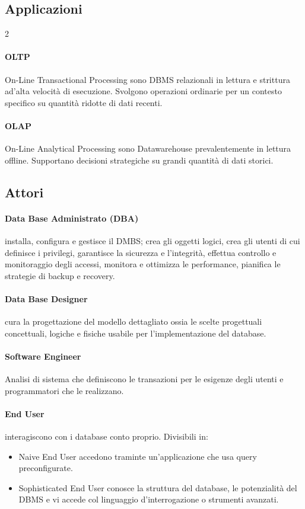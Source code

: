\subsection{Applicazioni}
\begin{paracol}{2}
	\paragraph{OLTP} On-Line Transactional Processing sono DBMS relazionali in lettura e strittura ad'alta velocità di esecuzione. Svolgono operazioni ordinarie per un contesto specifico su quantità ridotte di dati recenti.
	\switchcolumn
	\paragraph{OLAP} On-Line Analytical Processing sono Datawarehouse prevalentemente in lettura offline. Supportano decisioni strategiche su grandi quantità di dati storici.
\end{paracol}
\subsection{Attori}
\paragraph{Data Base Administrato (DBA)} installa, configura e gestisce il DMBS; crea gli oggetti logici, crea gli utenti di cui definisce i privilegi, garantisce la sicurezza e l'integrità, effettua controllo e monitoraggio degli accessi, monitora e ottimizza le performance, pianifica le strategie di backup e recovery.
\paragraph{Data Base Designer} cura la progettazione del modello dettagliato ossia le scelte progettuali concettuali, logiche e fisiche usabile per l'implementazione del database.
\paragraph{Software Engineer} Analisi di sistema che definiscono le transazioni per le esigenze degli utenti e programmatori che le realizzano.
\paragraph{End User} interagiscono con i database conto proprio. Divisibili in:
\begin{itemize}
	\item Naive End User accedono traminte un'applicazione che usa query preconfigurate.
	\item Sophisticated End User conosce la struttura del database, le potenzialità del DBMS e vi accede col linguaggio d'interrogazione o strumenti avanzati.
\end{itemize}

